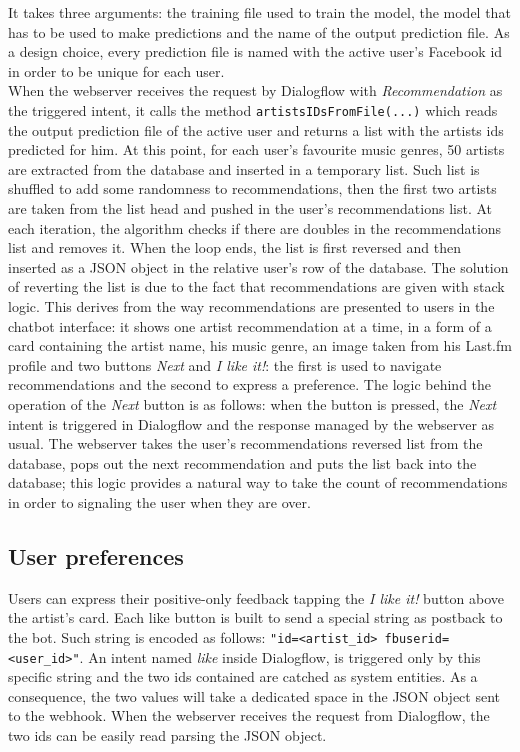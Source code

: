\documentclass[b5paper,10pt,twoside,cucitura]{toptesi}
\begin{document}
\noindent
It takes three arguments: the training file used to train the model, the model that has to be used to make predictions and the name of the output prediction file. As a design choice, every prediction file is named with the active user's Facebook id in order to be unique for each user.
\\
When the webserver receives the request by Dialogflow with \textit{Recommendation} as the triggered intent, it calls the method \texttt{artistsIDsFromFile(...)} which reads the output prediction file of the active user and returns a list with the artists ids predicted for him. At this point, for each user's favourite music genres, 50 artists are extracted from the database and inserted in a temporary list. Such list is shuffled to add some randomness to recommendations, then the first two artists are taken from the list head and pushed in the user's recommendations list. At each iteration, the algorithm checks if there are doubles in the recommendations list and removes it. When the loop ends, the list is first reversed and then inserted as a JSON object in the relative user's row of the database. The solution of reverting the list is due to the fact that recommendations are given with stack logic. This derives from the way recommendations are presented to users in the chatbot interface: it shows one artist recommendation at a time, in a form of a card containing the artist name, his music genre, an image taken from his Last.fm profile and two buttons \textit{Next} and \textit{I like it!}: the first is used to navigate recommendations and the second to express a preference. The logic behind the operation of the \textit{Next} button is as follows: when the button is pressed, the \textit{Next} intent is triggered in Dialogflow and the response managed by the webserver as usual. The webserver takes the user's recommendations reversed list from the database, pops out the next recommendation and puts the list back into the database; this logic provides a natural way to take the count of recommendations in order to signaling the user when they are over.

\newpage

\subsection{User preferences}

Users can express their positive-only feedback tapping the \textit{I like it!} button above the artist's card. Each like button is built to send a special string as postback to the bot. Such string is encoded as follows: \texttt{"id=<artist\_id> fbuserid=<user\_id>"}. An intent named \textit{like} inside Dialogflow, is triggered only by this specific string and the two ids contained are catched as system entities. As a consequence, the two values will take a dedicated space in the JSON object sent to the webhook. When the webserver receives the request from Dialogflow, the two ids can be easily read parsing the JSON object.
\end{document}
